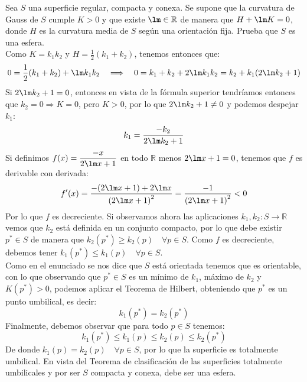 \documentclass[12pt]{article}
\begin{document}
    \begin{ejercicio}[3 puntos]
        Sea $S$ una superficie regular, compacta y conexa. Se supone que la curvatura de Gauss de $S$ cumple $K>0$ y que existe $\lm\in \mathbb{R}$ de manera que $H+\lm K= 0$, donde $H$ es la curvatura media de $S$ según una orientación fija. Prueba que $S$ es una esfera.\\

        \noindent
        Como $K = k_1k_2$ y $H = \frac{1}{2}(k_1+k_2)$, tenemos entonces que:
        \begin{equation*}
            0 = \frac{1}{2}(k_1 + k_2) + \lm k_1k_2 \quad\Longrightarrow\quad 0 = k_1+k_2+2\lm k_1k_2 = k_2 + k_1(2\lm k_2+1)
        \end{equation*}
        Si $2\lm k_2+1= 0$, entonces en vista de la fórmula superior tendríamos entonces que $k_2=0\Longrightarrow K = 0$, pero $K>0$, por lo que $2\lm k_2+1\neq 0$ y podemos despejar $k_1$:
        \begin{equation*}
            k_1 = \frac{-k_2}{2\lm k_2 + 1}
        \end{equation*}
        Si definimos $f(x) = \dfrac{-x}{2\lm x + 1}$ en todo $\mathbb{R}$ menos $2\lm x + 1 = 0$, tenemos que $f$ es derivable con derivada:
        \begin{equation*}
            f'(x) = \frac{-(2\lm x+1)+2\lm x}{{(2\lm x+1)}^{2}} = \frac{-1}{{(2\lm x+1)}^{2}} < 0
        \end{equation*}
        Por lo que $f$ es decreciente. Si observamos ahora las aplicaciones $k_1,k_2:S\to\mathbb{R}$ vemos que $k_2$ está definida en un conjunto compacto, por lo que debe existir $p^\ast \in S$ de manera que $k_2(p^\ast)\geq k_2(p)\quad \forall p\in S$. Como $f$ es decreciente, debemos tener $k_1(p^\ast)\leq k_1(p)\quad \forall p\in S$.\\

        \noindent
        Como en el enunciado se nos dice que $S$ está orientada tenemos que es orientable, con lo que observando que $p^\ast\in S$ es un mínimo de $k_1$, máximo de $k_2$ y $K(p^\ast)>0$, podemos aplicar el Teorema de Hilbert, obteniendo que $p^\ast$ es un punto umbilical, es decir:
        \begin{equation*}
            k_1(p^\ast) = k_2(p^\ast)
        \end{equation*}
        Finalmente, debemos observar que para todo $p\in S$ tenemos:
        \begin{equation*}
            k_1(p^\ast) \leq k_1(p) \leq k_2(p) \leq k_2(p^\ast)
        \end{equation*}
        De donde $k_1(p) = k_2(p)\quad \forall p\in S$, por lo que la superficie es totalmente umbilical. En vista del Teorema de clasificación de las superficies totalmente umbilicales y por ser $S$ compacta y conexa, debe ser una esfera.
    \end{ejercicio}
\end{document}
